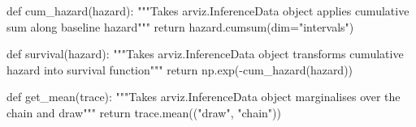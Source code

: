 \documentclass[
  letterpaper,
  DIV=11,
  numbers=noendperiod]{scrartcl}
\newenvironment{Shaded}{\begin{snugshade}}{\end{snugshade}}
\newcommand{\CommentTok}[1]{\textcolor[rgb]{0.37,0.37,0.37}{#1}}
\newcommand{\ControlFlowTok}[1]{\textcolor[rgb]{0.00,0.23,0.31}{#1}}
\newcommand{\KeywordTok}[1]{\textcolor[rgb]{0.00,0.23,0.31}{#1}}
\newcommand{\NormalTok}[1]{\textcolor[rgb]{0.00,0.23,0.31}{#1}}
\newcommand{\OperatorTok}[1]{\textcolor[rgb]{0.37,0.37,0.37}{#1}}
\newcommand{\StringTok}[1]{\textcolor[rgb]{0.13,0.47,0.30}{#1}}
\begin{document}
\begin{Shaded}
\begin{Highlighting}[]
\KeywordTok{def}\NormalTok{ cum\_hazard(hazard):}
    \CommentTok{"""Takes arviz.InferenceData object applies}
\CommentTok{    cumulative sum along baseline hazard"""}
    \ControlFlowTok{return}\NormalTok{ hazard.cumsum(dim}\OperatorTok{=}\StringTok{"intervals"}\NormalTok{)}


\KeywordTok{def}\NormalTok{ survival(hazard):}
    \CommentTok{"""Takes arviz.InferenceData object transforms}
\CommentTok{    cumulative hazard into survival function"""}
    \ControlFlowTok{return}\NormalTok{ np.exp(}\OperatorTok{{-}}\NormalTok{cum\_hazard(hazard))}


\KeywordTok{def}\NormalTok{ get\_mean(trace):}
    \CommentTok{"""Takes arviz.InferenceData object marginalises}
\CommentTok{    over the chain and draw"""}
    \ControlFlowTok{return}\NormalTok{ trace.mean((}\StringTok{"draw"}\NormalTok{, }\StringTok{"chain"}\NormalTok{))}
\end{Highlighting}
\end{Shaded}
\end{document}
